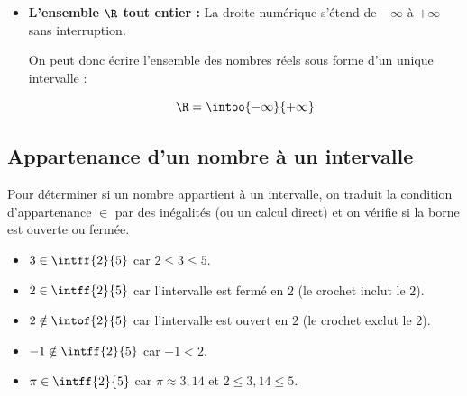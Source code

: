 \begin{remarque}
\begin{itemize}
\begin{itemize}
		      \end{itemize}
		\item \textbf{L'ensemble $\R$ tout entier :} La droite numérique s'étend de $-\infty$ à $+\infty$ sans interruption.

		      On peut donc écrire l'ensemble des nombres réels sous forme d'un unique intervalle :

		      \[
			      \R = \intoo{-\infty}{+\infty}
		      \]

	\end{itemize}
\end{remarque}

\subsection{Appartenance d'un nombre à un intervalle}

\begin{meth}
	Pour déterminer si un nombre appartient à un intervalle, on traduit la condition d'appartenance $\in$ par des inégalités (ou un calcul direct) et on vérifie si la borne est ouverte ou fermée.

	\begin{itemize}
		\item $3 \in \intff{2}{5}$ \quad car \quad $2 \leqslant 3 \leqslant 5$.
		\item $2 \in \intff{2}{5}$ \quad car l'intervalle est fermé en $2$ (le crochet \og{}inclut\fg{} le $2$).
		\item $2 \notin \intof{2}{5}$ \quad car l'intervalle est ouvert en $2$ (le crochet \og{}exclut\fg{} le $2$).
		\item $-1 \notin \intff{2}{5}$ \quad car $-1 < 2$.
		\item $\pi \in \intff{2}{5}$ \quad car $\pi \approx 3{,}14$ et $2 \leqslant 3{,}14 \leqslant 5$.
	\end{itemize}
\end{meth}


